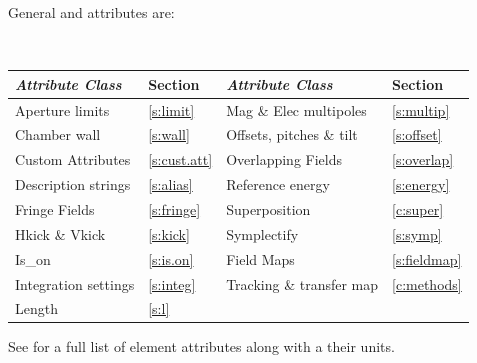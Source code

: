 General  and  attributes are:
\begin{center}
\tt
\begin{tabular}{llll} \toprule
  {\sl Attribute Class}      & Section           & {\sl Attribute Class}      & Section          \\ \midrule
  Aperture limits            & \ref{s:limit}     & Mag \& Elec multipoles     & \ref{s:multip}   \\ 
  Chamber wall               & \ref{s:wall}      & Offsets, pitches \& tilt   & \ref{s:offset}   \\
  Custom Attributes          & \ref{s:cust.att}  & Overlapping Fields         & \ref{s:overlap}  \\
  Description strings        & \ref{s:alias}     & Reference energy           & \ref{s:energy}   \\ 
  Fringe Fields              & \ref{s:fringe}    & Superposition              & \ref{c:super}    \\
  Hkick \& Vkick             & \ref{s:kick}      & Symplectify                & \ref{s:symp}     \\
  Is_on                      & \ref{s:is.on}     & Field Maps                 & \ref{s:fieldmap} \\
  Integration settings       & \ref{s:integ}     & Tracking \& transfer map   & \ref{c:methods}  \\
  Length                     & \ref{s:l}         &                            &                  \\
  \bottomrule
\end{tabular}
\end{center}
\toffset
See  for a full list of element attributes along with a their units.

